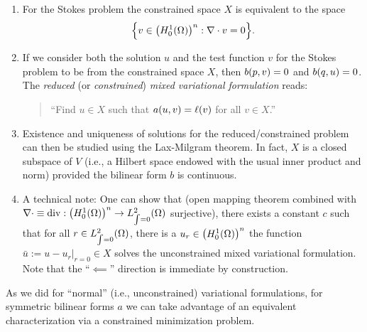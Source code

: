 \begin{remark}
	\begin{enumerate}
		\item For the Stokes problem the constrained space \(X\) is equivalent to the space
		\[
			\braces*{v \in \parentheses*{H_0^1\parentheses*{\Omega}}^n : \nabla \cdot v = 0}.
		\]
		\item If we consider both the solution \(u\) and the test function \(v\) for the Stokes problem to be from the constrained space \(X\), then \(b\parentheses*{p, v} = 0\) and \(b\parentheses*{q, u} = 0\).
		The \emph{reduced} (or \emph{constrained}) \emph{mixed variational formulation} reads:
		\begin{quote}
			``Find \(u \in X\) such that \(a\parentheses*{u, v} = \ell\parentheses*{v}\) for all \(v \in X\).''
		\end{quote}
		\item Existence and uniqueness of solutions for the reduced/constrained problem can then be studied using the Lax-Milgram theorem.
		In fact, \(X\) is a closed subspace of \(V\) (i.e., a Hilbert space endowed with the usual inner product and norm) provided the bilinear form \(b\) is continuous.
		\item A technical note:
		One can show that (open mapping theorem combined with \(\nabla \cdot \equiv \div: \parentheses*{H_0^1\parentheses*{\Omega}}^n \to L_{\int = 0}^2\parentheses*{\Omega}\) surjective), there exists a constant \(c\) such that for all \(r \in L_{\int = 0}^2\parentheses*{\Omega}\), there is a \(u_r \in \parentheses*{H_0^1\parentheses*{\Omega}}^n\) the function \(\bar{u} := u - \left.u_r\right|_{r = 0} \in X\) solves the unconstrained mixed variational formulation.
		Note that the ``\(\impliedby\)'' direction is immediate by construction.
	\end{enumerate}
\end{remark}

As we did for ``normal'' (i.e., unconstrained) variational formulations, for symmetric bilinear forms \(a\) we can take advantage of an equivalent characterization via a constrained minimization problem.

